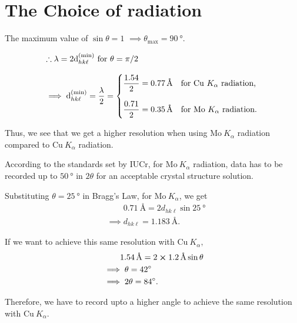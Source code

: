 \section{The Choice of radiation}
	
The maximum value of $\sin \theta = 1$ $\implies \theta_\mathrm{max} = \SI{90}{\degree}.$

\begin{align}
&\therefore \lambda = 2 \d_{hk\ell}^\mathrm{(min)} ~ \mathrm{for} ~ \theta = \pi/2 \nonumber \\[0.8em]
&\implies \d_{hk\ell}^\mathrm{(min)} = \dfrac{\lambda}{2} = \begin{dcases*}
\dfrac{1.54}{2} = \SI{0.77}{\angstrom} & for $\mathrm{Cu}~K_\alpha$ radiation, \\[0.8em]
\dfrac{0.71}{2} = \SI{0.35}{\angstrom} & for $\mathrm{Mo}~K_\alpha$ radiation.
\end{dcases*}
\end{align}

Thus, we see that we get a higher resolution when using $\mathrm{Mo}~K_\alpha$ radiation compared to $\mathrm{Cu}~K_\alpha$ radiation.

According to the standards set by IUCr, for $\mathrm{Mo}~K_\alpha$ radiation, data has to be recorded  up to $\SI{50}{\degree}$ in $2\theta$ for an acceptable crystal structure solution.

Substituting $\theta = \SI{25}{\degree}$ in Bragg's Law, for $\mathrm{Mo}~K_\alpha$, we get%
%
\begin{align}
&\phantom{\implies} \SI{0.71}{\angstrom} = 2 d_{hk\ell} \sin \SI{25}{\degree} \nonumber \\
&\implies d_{hk\ell} = \SI{1.183}{\angstrom}.
\end{align}

If we want to achieve this same resolution with $\mathrm{Cu}~K_\alpha,$%
%
\begin{align}
&\phantom{\implies} \SI{1.54}{\angstrom} = 2 \cross \SI{1.2}{\angstrom} \sin \theta \nonumber \\
&\implies \theta = \SI{42}{\degree} \nonumber \\
&\implies 2\theta = \SI{84}{\degree}.
\end{align}

Therefore, we have to record upto a higher angle to achieve the same resolution with $\mathrm{Cu}~K_\alpha.$

